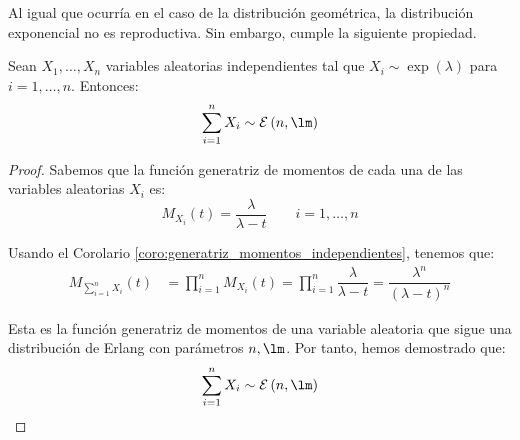 Al igual que ocurría en el caso de la distribución geométrica, la distribución exponencial no es reproductiva. Sin embargo, cumple la siguiente propiedad.
\begin{prop}
    Sean $X_1, \dots, X_n$ variables aleatorias independientes tal que $X_i\sim \exp(\lambda)$ para $i=1,\dots,n$. Entonces:
    \begin{equation*}
        \sum_{i=1}^{n}X_i \sim \cc{E}\left(n,\lm\right)
    \end{equation*}

    \begin{proof}
        Sabemos que la función generatriz de momentos de cada una de las variables aleatorias $X_i$ es:
        \begin{equation*}
            M_{X_i}(t) = \dfrac{\lambda}{\lambda-t} \qquad i=1,\dots,n
        \end{equation*}
    
        Usando el Corolario \ref{coro:generatriz_momentos_independientes}, tenemos que:
        \begin{align*}
            M_{\sum\limits_{i=1}^{n}X_i}(t) &= \prod_{i=1}^{n}M_{X_i}(t) = \prod_{i=1}^{n}\dfrac{\lambda}{\lambda-t} = \dfrac{\lambda^n}{(\lambda-t)^n}
        \end{align*}

        Esta es la función generatriz de momentos de una variable aleatoria que sigue una distribución de Erlang con parámetros $n,\lm$. Por tanto, hemos demostrado que:
        \begin{equation*}
            \sum_{i=1}^{n}X_i \sim \cc{E}\left(n,\lm\right)
        \end{equation*}
    \end{proof}
\end{prop}

